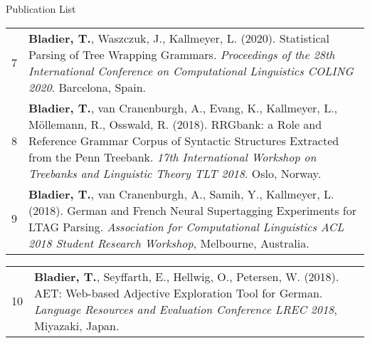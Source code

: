 \documentclass{resume} %
\begin{document}
\begin{rSection}{Publication List}
\begin{tabular}{p{0.1cm}p{17cm}}
 7 & {\bf Bladier, T.}, Waszczuk, J., Kallmeyer, L. (2020). Statistical Parsing of Tree Wrapping Grammars.  {\it  Proceedings of the 28th International Conference on Computational Linguistics COLING 2020}. Barcelona, Spain. \\[5pt]
 
  8 & {\bf Bladier, T.}, van Cranenburgh, A., Evang, K., Kallmeyer, L., M{\"o}llemann, R., Osswald, R. (2018). RRGbank: a Role and Reference Grammar Corpus of Syntactic Structures Extracted from the Penn Treebank.  {\it 17th International Workshop on Treebanks and Linguistic Theory TLT 2018}. Oslo, Norway. \\[5pt]
  
   9 & {\bf Bladier, T.}, van Cranenburgh, A., Samih, Y.,  Kallmeyer, L. (2018). German and French Neural Supertagging Experiments for LTAG Parsing. {\it Association for Computational Linguistics ACL 2018 Student Research Workshop}, Melbourne, Australia. \\[5pt]
 
\end{tabular}
  
\begin{tabular}{p{0.1cm}p{17cm}}

 
 10 & {\bf Bladier, T.}, Seyffarth, E., Hellwig, O., Petersen, W. (2018). AET: Web-based Adjective Exploration Tool for German. {\it  Language Resources and Evaluation Conference LREC 2018}, Miyazaki, Japan. 
\end{tabular}

\end{rSection}

\bigskip
\end{document}
